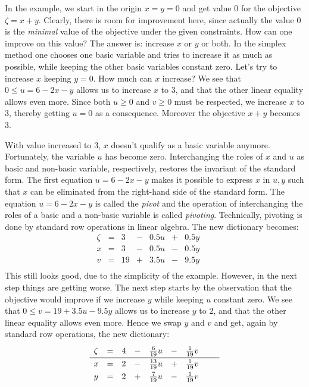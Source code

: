 \documentclass[ukenglish]{nik}
\begin{document}
In the example, we start in the origin $x=y=0$ and get
value 0 for the objective $\zeta = x + y$.
Clearly, there is room for improvement here, since actually 
the value 0 is the \emph{minimal} value of the objective
under the given constraints. How can one improve on this
value? The answer is: increase $x$ or $y$ or both.
In the simplex method one chooses one basic variable and
tries to increase it as much as possible, while keeping the
other basic variables constant zero.
Let's try to increase $x$ keeping $y=0$. How much can $x$ increase?
We see that $0 \leq u = 6 -2x-y$ allows us to increase $x$ to $3$,
and that the other linear equality allows even more. Since both
$u\geq 0$ and $v\geq 0$ must be respected, we increase $x$ to $3$,
thereby getting $u=0$ as a consequence. Moreover the objective $x+y$ becomes 3.

With value increased to $3$, $x$ doesn't qualify as a basic variable anymore.
Fortunately, the variable $u$ has become zero. Interchanging the roles of
$x$ and $u$ as basic and non-basic variable, respectively, restores 
the invariant of the standard form. The first equation $u = 6 -2x-y$ makes it
possible to express $x$ in $u,y$ such that $x$ can be eliminated from the
right-hand side of the standard form. The equation $u = 6 -2x-y$ is
called the \emph{pivot} and the operation of interchanging the roles of
a basic and a non-basic variable is called \emph{pivoting}.
Technically, pivoting is done by standard row operations in linear algebra. 
The new dictionary becomes:
\[    
    \begin{array}{lcrcrcrcr}
      \zeta&=& 3 &-& 0.5 u &+& 0.5 y & &  \\\hline
      x    &=& 3 &-& 0.5 u &-& 0.5 y & &  \\
      v    &=& 19&+& 3.5 u &-& 9.5 y & &  \\

    \end{array}
\]
This still looks good, due to the simplicity of the example.
However, in the next step things are getting worse. The next step
starts by the observation that the objective would improve if we 
increase $y$ while keeping $u$ constant zero. We see that
$0\leq v = 19 + 3.5u - 9.5y$ allows us to increase $y$ to $2$,
and that the other linear equality allows even more.
Hence we swap $y$ and $v$ and get,
again by standard row operations, the new dictionary:
\[    
    \begin{array}{lcrcrcrcr}
      \zeta&=& 4 &-& \frac{6}{19} u &-& \frac{1}{19} v &\vphantom{\frac{|}{|}} &  \\\hline
      x    &=& 2 &-&\frac{13}{19} u &+& \frac{1}{19} v &\vphantom{\frac{|}{|}} &  \\
      y    &=& 2 &+& \frac{7}{19} u &-& \frac{1}{19} v &\vphantom{\frac{|}{|}} &  \\
    \end{array}
\]
\end{document}
